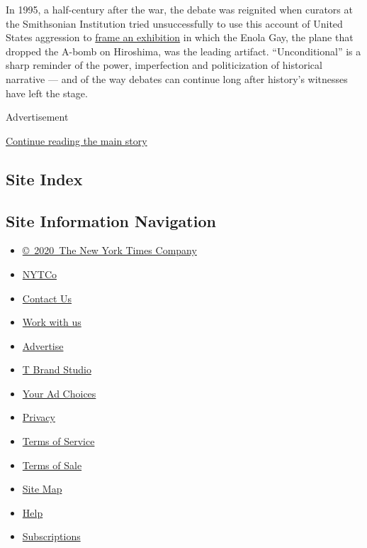 In 1995, a half-century after the war, the debate was reignited when
curators at the Smithsonian Institution tried unsuccessfully to use this
account of United States aggression to
\href{https://www.atomicheritage.org/history/controversy-over-enola-gay-exhibition}{frame
an exhibition} in which the Enola Gay, the plane that dropped the A-bomb
on Hiroshima, was the leading artifact. ``Unconditional'' is a sharp
reminder of the power, imperfection and politicization of historical
narrative --- and of the way debates can continue long after history's
witnesses have left the stage.

Advertisement

\protect\hyperlink{after-bottom}{Continue reading the main story}

\hypertarget{site-index}{%
\subsection{Site Index}\label{site-index}}

\hypertarget{site-information-navigation}{%
\subsection{Site Information
Navigation}\label{site-information-navigation}}

\begin{itemize}
\tightlist
\item
  \href{https://help.nytimes3xbfgragh.onion/hc/en-us/articles/115014792127-Copyright-notice}{©~2020~The
  New York Times Company}
\end{itemize}

\begin{itemize}
\tightlist
\item
  \href{https://www.nytco.com/}{NYTCo}
\item
  \href{https://help.nytimes3xbfgragh.onion/hc/en-us/articles/115015385887-Contact-Us}{Contact
  Us}
\item
  \href{https://www.nytco.com/careers/}{Work with us}
\item
  \href{https://nytmediakit.com/}{Advertise}
\item
  \href{http://www.tbrandstudio.com/}{T Brand Studio}
\item
  \href{https://www.nytimes3xbfgragh.onion/privacy/cookie-policy\#how-do-i-manage-trackers}{Your
  Ad Choices}
\item
  \href{https://www.nytimes3xbfgragh.onion/privacy}{Privacy}
\item
  \href{https://help.nytimes3xbfgragh.onion/hc/en-us/articles/115014893428-Terms-of-service}{Terms
  of Service}
\item
  \href{https://help.nytimes3xbfgragh.onion/hc/en-us/articles/115014893968-Terms-of-sale}{Terms
  of Sale}
\item
  \href{https://spiderbites.nytimes3xbfgragh.onion}{Site Map}
\item
  \href{https://help.nytimes3xbfgragh.onion/hc/en-us}{Help}
\item
  \href{https://www.nytimes3xbfgragh.onion/subscription?campaignId=37WXW}{Subscriptions}
\end{itemize}

